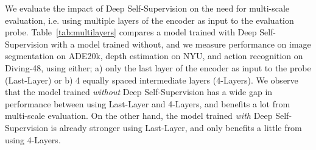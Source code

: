 \documentclass[]{fairmeta}
\begin{document}
We evaluate the impact of Deep Self-Supervision on the need for multi-scale evaluation, i.e. using multiple layers of the encoder as input to the evaluation probe. Table~\ref{tab:multilayers} compares a model trained with Deep Self-Supervision with a model trained without, and we measure performance on image segmentation on ADE20k, depth estimation on NYU, and action recognition on Diving-48, using either; a) only the last layer of the encoder as input to the probe (Last-Layer) or b) 4 equally spaced intermediate layers (4-Layers). We observe that the model trained \textit{without} Deep Self-Supervision has a wide gap in performance between using Last-Layer and 4-Layers, and benefits a lot from multi-scale evaluation. On the other hand, the model trained \textit{with} Deep Self-Supervision is already stronger using Last-Layer, and only benefits a little from using 4-Layers.

\begin{table}
\centering
\caption{\textbf{Impact of deep self-supervision on the need for multi-scale evaluation.} We conduct experiments with  our V-JEPA 2.1 ViT-L trained from scratch. Last-Layer indicates that evaluation is conducted with only the last layer of the encoder as input to the probe. 4-Layers indicates that evaluation is conducted by concatenating 4 intermediate layers of the encoder and feeding it to the probe.}
\label{tab:multilayers}
\end{table}
\end{document}
